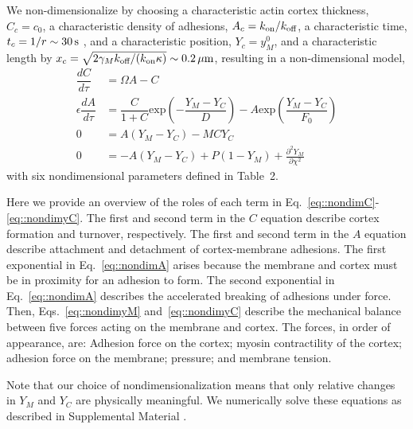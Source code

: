We non-dimensionalize by choosing a characteristic actin cortex thickness, $C_c= c_0$, a characteristic density of adhesions, $A_c =  k_{\mbox{\scriptsize on}}/k_{\mbox{\scriptsize off}}$, a characteristic time, $t_c=1/r \sim 30\,\mbox{s}$ \cite{Fritzsche:2014jw}, and a characteristic position, $Y_c=y_M^0$, and a characteristic length by $x_c =\sqrt{2 \gamma_M k_{\mbox{\scriptsize off}}/(k_{\mbox{\scriptsize on}} \kappa)} \sim 0.2\,\mu\mbox{m}$, resulting in a non-dimensional model, 
\begin{align}
\dfrac{dC}{d \tau}  & =  \Omega A - C\label{eq::nondimC}\\
\epsilon\dfrac{dA}{ d \tau}  & =  \dfrac{C}{1+C} \mbox{exp}\left(-\dfrac{Y_M-Y_C}{D}\right) - A \mbox{exp} \left(\dfrac{Y_M-Y_C}{F_0} \right) \label{eq::nondimA}\\
0 & = A(Y_M-Y_C) - MCY_C \label{eq::nondimyM}\\
0 & = -A(Y_M-Y_C) + P(1-Y_M) +  \frac{\partial^2 Y_M}{\partial \chi^2} \label{eq::nondimyC}
\end{align}
with six nondimensional parameters defined in Table~2. 

{\color{blue}Here we provide an overview of the roles of each term in Eq.~\ref{eq::nondimC}-\ref{eq::nondimyC}. The first and second term in the $C$ equation describe cortex formation and turnover, respectively. The first and second term in the $A$ equation describe attachment and detachment of cortex-membrane adhesions. The first exponential in Eq.~\ref{eq::nondimA} arises because the membrane and cortex must be in proximity for an adhesion to form. The second exponential in Eq.~\ref{eq::nondimA} describes the accelerated breaking of adhesions under force. Then, Eqs.~\ref{eq::nondimyM} and~\ref{eq::nondimyC} describe the mechanical balance between five forces acting on the membrane and cortex. The forces, in order of appearance, are: Adhesion force on the cortex; myosin contractility of the cortex; adhesion force on the membrane; pressure; and membrane tension.}

Note that our choice of nondimensionalization means that only relative changes in $Y_M$ and $Y_C$ are physically meaningful. We numerically solve these equations as described in Supplemental Material \cite{wise07}. 




